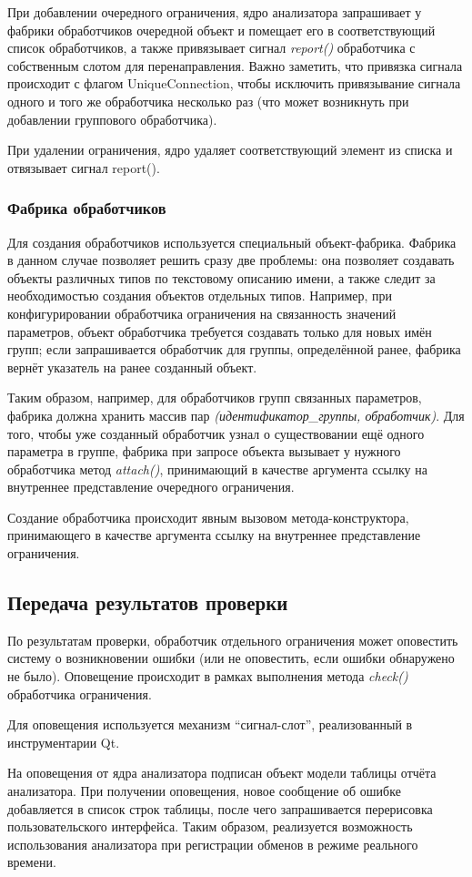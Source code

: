 При добавлении очередного ограничения, ядро анализатора запрашивает у фабрики 
обработчиков очередной объект и помещает его в соответствующий список 
обработчиков, а также привязывает сигнал \textit{report()} обработчика с 
собственным слотом для перенаправления. Важно заметить, что привязка сигнала 
происходит с флагом UniqueConnection, чтобы исключить привязывание сигнала 
одного и того же обработчика несколько раз (что может возникнуть при добавлении 
группового обработчика).

При удалении ограничения, ядро удаляет соответствующий элемент из списка и 
отвязывает сигнал report().

\subsubsection{Фабрика обработчиков}

Для создания обработчиков используется специальный объект-фабрика. 
Фабрика в данном случае позволяет решить сразу две проблемы: она позволяет 
создавать объекты различных типов по текстовому описанию имени, а также следит 
за необходимостью создания объектов отдельных типов. Например, при 
конфигурировании обработчика ограничения на связанность значений параметров, 
объект обработчика требуется создавать только для новых имён групп; если 
запрашивается обработчик для группы, определённой ранее, фабрика вернёт 
указатель на ранее созданный объект.

Таким образом, например, для обработчиков групп связанных параметров, фабрика 
должна хранить массив пар \textit{(идентификатор\_группы, обработчик)}. Для 
того, чтобы уже созданный обработчик узнал о существовании ещё одного параметра 
в группе, фабрика при запросе объекта вызывает у нужного обработчика метод 
\textit{attach()}, принимающий в качестве аргумента ссылку на внутреннее 
представление очередного ограничения.

Создание обработчика происходит явным вызовом метода-конструктора, принимающего 
в качестве аргумента ссылку на внутреннее представление ограничения.

\subsection{Передача результатов проверки}

По результатам проверки, обработчик отдельного ограничения может оповестить 
систему о возникновении ошибки (или не оповестить, если ошибки обнаружено не 
было). Оповещение происходит в рамках выполнения метода \textit{check()} 
обработчика ограничения.

Для оповещения используется механизм ``сигнал-слот'', реализованный в 
инструментарии Qt.

На оповещения от ядра анализатора подписан объект модели таблицы отчёта 
анализатора. При получении оповещения, новое сообщение об ошибке добавляется в 
список строк таблицы, после чего запрашивается перерисовка пользовательского 
интерфейса. Таким образом, реализуется возможность использования анализатора при 
регистрации обменов в режиме реального времени.